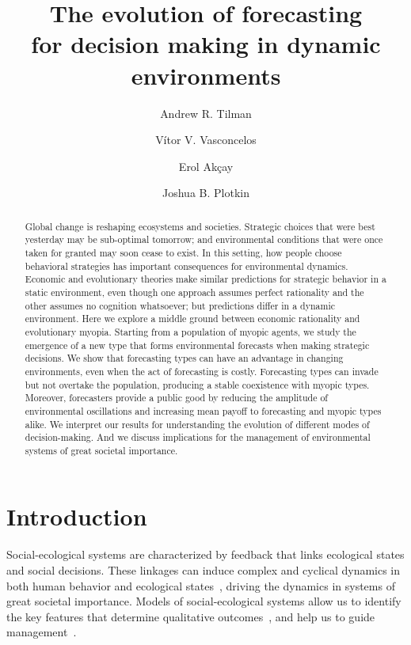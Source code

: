 \documentclass{article}
\title{The evolution of forecasting \\
for decision making in dynamic environments}
\author[a*]{Andrew R. Tilman}
\author[bc]{V\'itor V. Vasconcelos}
\author[d]{Erol Ak\c{c}ay}
\author[d]{Joshua B. Plotkin}
\begin{document}
\maketitle
\onehalfspacing

\begin{abstract}
\noindent Global change is reshaping ecosystems and societies. Strategic choices that were best yesterday may be sub-optimal tomorrow; and environmental conditions that were once taken for granted may soon cease to exist. In this setting, how people choose behavioral strategies has important consequences for environmental dynamics. Economic and evolutionary theories make similar predictions for strategic behavior in a static environment, even though one approach assumes perfect rationality and the other assumes no cognition whatsoever; but predictions differ in a dynamic environment. Here we explore a middle ground between economic rationality and evolutionary myopia. Starting from a population of myopic agents, we study the emergence of a new type that forms environmental forecasts when making strategic decisions. We show that forecasting types can have an advantage in changing environments, even when the act of forecasting is costly. Forecasting types can invade but not overtake the population, producing a stable coexistence with myopic types. Moreover, forecasters provide a public good by reducing the amplitude of environmental oscillations and increasing mean payoff to forecasting and myopic types alike. We interpret our results for understanding the evolution of different modes of decision-making. And we discuss implications for the management of environmental systems of great societal importance.
\end{abstract}



\section*{Introduction}

Social-ecological systems are characterized by feedback that links ecological states and social decisions. These linkages can induce complex and cyclical dynamics in both human behavior and ecological states~\citep{levin2013social,bieg2017,tilman2018revenue}, driving the dynamics in systems of great societal importance. Models of social-ecological 
systems allow us to identify the key features that determine qualitative outcomes~\citep{schlueter2012new}, and help us to guide management~\citep{farahbakhsh2022}. 
\end{document}

